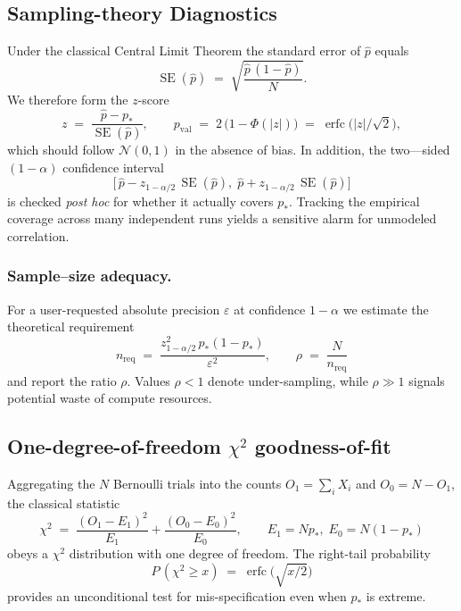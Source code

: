 \subsection{Sampling-theory Diagnostics}
Under the classical Central Limit Theorem the standard error of \(\hat p\) equals
\begin{equation}
  \operatorname{SE}(\hat p) \;=\; \sqrt{\frac{\hat p\,(1-\hat p)}{N}}.
\end{equation}
We therefore form the $z$-score
\begin{equation}
  z \;=\; \frac{\hat p - p_*}{\operatorname{SE}(\hat p)},
  \qquad
  p_{\text{val}} \;=\; 2\,\bigl(1-\Phi(|z|)\bigr) \;=\; \operatorname{erfc}\!\bigl(|z|/\sqrt{2}\bigr),
  \label{eq:z_score}
\end{equation}
which should follow $\mathcal N(0,1)$ in the absence of bias.  In addition, the two—sided $(1-\alpha)$ confidence interval
\begin{equation}
  \bigl[\,\hat p - z_{1-\alpha/2}\,\operatorname{SE}(\hat p),\;\hat p + z_{1-\alpha/2}\,\operatorname{SE}(\hat p)\bigr]
\end{equation}
is checked \emph{post hoc} for whether it actually covers $p_*$.  Tracking the empirical coverage across many independent runs yields a sensitive alarm for unmodeled correlation.

\subsubsection{Sample–size adequacy.}  For a user-requested absolute precision $\varepsilon$ at confidence $1-\alpha$ we estimate the theoretical requirement
\begin{equation}
  n_{\text{req}} \;=\; \frac{z_{1-\alpha/2}^{2}\, p_*(1-p_*)}{\varepsilon^{2}},
  \qquad
  \rho \;=\; \frac{N}{n_{\text{req}}}
  \label{eq:n_required}
\end{equation}
and report the ratio $\rho$.  Values $\rho<1$ denote under-sampling, while $\rho\gg1$ signals potential waste of compute resources.

\subsection{One-degree-of-freedom $\chi^{2}$ goodness-of-fit}
Aggregating the $N$ Bernoulli trials into the counts 
$O_1=\sum_i X_i$ and $O_0 = N-O_1$, the classical statistic
\begin{equation}
  \chi^{2} \;=\; \frac{(O_1-E_1)^{2}}{E_1} 
               + \frac{(O_0-E_0)^{2}}{E_0},
  \qquad
  E_1 = N p_*,\; E_0 = N(1-p_*)
  \label{eq:chisq}
\end{equation}
obeys a $\chi^{2}$ distribution with one degree of freedom.  The right-tail probability
\begin{equation}
  P\,(\chi^{2}\ge x) \;=\; \operatorname{erfc}\!\bigl(\sqrt{x/2}\bigr)
\end{equation}
provides an unconditional test for mis-specification even when $p_*$ is extreme.

